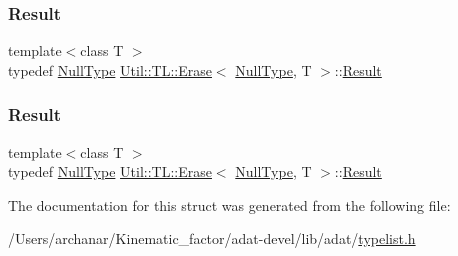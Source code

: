 \mbox{\label{structUtil_1_1TL_1_1Erase_3_01NullType_00_01T_01_4_a322fc628c66685b497fdb4d01f456b18}} 
\subsubsection{\texorpdfstring{Result}{Result}\hspace{0.1cm}{\footnotesize\ttfamily [2/3]}}
{\footnotesize\ttfamily template$<$class T $>$ \\
typedef \mbox{\hyperlink{classUtil_1_1NullType}{Null\+Type}} \mbox{\hyperlink{structUtil_1_1TL_1_1Erase}{Util\+::\+T\+L\+::\+Erase}}$<$ \mbox{\hyperlink{classUtil_1_1NullType}{Null\+Type}}, T $>$\+::\mbox{\hyperlink{structUtil_1_1TL_1_1Erase_3_01NullType_00_01T_01_4_a322fc628c66685b497fdb4d01f456b18}{Result}}}

\mbox{\label{structUtil_1_1TL_1_1Erase_3_01NullType_00_01T_01_4_a322fc628c66685b497fdb4d01f456b18}} 
\subsubsection{\texorpdfstring{Result}{Result}\hspace{0.1cm}{\footnotesize\ttfamily [3/3]}}
{\footnotesize\ttfamily template$<$class T $>$ \\
typedef \mbox{\hyperlink{classUtil_1_1NullType}{Null\+Type}} \mbox{\hyperlink{structUtil_1_1TL_1_1Erase}{Util\+::\+T\+L\+::\+Erase}}$<$ \mbox{\hyperlink{classUtil_1_1NullType}{Null\+Type}}, T $>$\+::\mbox{\hyperlink{structUtil_1_1TL_1_1Erase_3_01NullType_00_01T_01_4_a322fc628c66685b497fdb4d01f456b18}{Result}}}



The documentation for this struct was generated from the following file\+:\begin{DoxyCompactItemize}
\item 
/\+Users/archanar/\+Kinematic\+\_\+factor/adat-\/devel/lib/adat/\mbox{\hyperlink{adat-devel_2lib_2adat_2typelist_8h}{typelist.\+h}}\end{DoxyCompactItemize}
